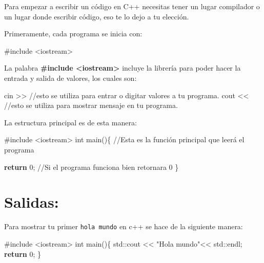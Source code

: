 \documentclass[
  11pt,
  a4paper,
  DIV=11,
  numbers=noendperiod]{scrreprt}
\newenvironment{Shaded}{\begin{snugshade}}{\end{snugshade}}
\newcommand{\BuiltInTok}[1]{\textcolor[rgb]{0.00,0.23,0.31}{#1}}
\newcommand{\CommentTok}[1]{\textcolor[rgb]{0.37,0.37,0.37}{#1}}
\newcommand{\ControlFlowTok}[1]{\textcolor[rgb]{0.00,0.23,0.31}{\textbf{#1}}}
\newcommand{\DataTypeTok}[1]{\textcolor[rgb]{0.68,0.00,0.00}{#1}}
\newcommand{\DecValTok}[1]{\textcolor[rgb]{0.68,0.00,0.00}{#1}}
\newcommand{\ImportTok}[1]{\textcolor[rgb]{0.00,0.46,0.62}{#1}}
\newcommand{\NormalTok}[1]{\textcolor[rgb]{0.00,0.23,0.31}{#1}}
\newcommand{\OperatorTok}[1]{\textcolor[rgb]{0.37,0.37,0.37}{#1}}
\newcommand{\PreprocessorTok}[1]{\textcolor[rgb]{0.68,0.00,0.00}{#1}}
\newcommand{\StringTok}[1]{\textcolor[rgb]{0.13,0.47,0.30}{#1}}
\begin{document}
Para empezar a escribir un código en C++ necesitas tener un lugar
compilador o un lugar donde escribir código, eso te lo dejo a tu
elección.

Primeramente, cada programa se inicia con:

\begin{Shaded}
\begin{Highlighting}[]
\PreprocessorTok{\#include }\ImportTok{\textless{}iostream\textgreater{}}
\end{Highlighting}
\end{Shaded}

La palabra \textbf{\#include \textless iostream\textgreater{}} incluye
la librería para poder hacer la entrada y salida de valores, los cuales
son:

\begin{Shaded}
\begin{Highlighting}[]
\NormalTok{cin }\OperatorTok{\textgreater{}\textgreater{}} \CommentTok{//esto se utiliza para entrar o digitar valores a tu programa.}
\NormalTok{cout }\OperatorTok{\textless{}\textless{}} \CommentTok{//esto se utiliza para mostrar mensaje en tu programa.}
\end{Highlighting}
\end{Shaded}

La estructura principal es de esta manera:

\begin{Shaded}
\begin{Highlighting}[]
\PreprocessorTok{\#include }\ImportTok{\textless{}iostream\textgreater{}}
\DataTypeTok{int}\NormalTok{ main}\OperatorTok{()\{}  \CommentTok{//Esta es la función principal que leerá el programa}
  
    \ControlFlowTok{return} \DecValTok{0}\OperatorTok{;} \CommentTok{//Si el programa funciona bien retornara 0}
\OperatorTok{\}}
\end{Highlighting}
\end{Shaded}

\section{Salidas:}\label{salidas}

Para mostrar tu primer \texttt{hola\ mundo} en c++ se hace de la
siguiente manera:

\begin{Shaded}
\begin{Highlighting}[]
\PreprocessorTok{\#include }\ImportTok{\textless{}iostream\textgreater{}}
\DataTypeTok{int}\NormalTok{ main}\OperatorTok{()\{}
    \BuiltInTok{std::}\NormalTok{cout }\OperatorTok{\textless{}\textless{}} \StringTok{"Hola mundo"}\OperatorTok{\textless{}\textless{}} \BuiltInTok{std::}\NormalTok{endl}\OperatorTok{;}
    \ControlFlowTok{return} \DecValTok{0}\OperatorTok{;}
\OperatorTok{\}}
\end{Highlighting}
\end{Shaded}
\end{document}
